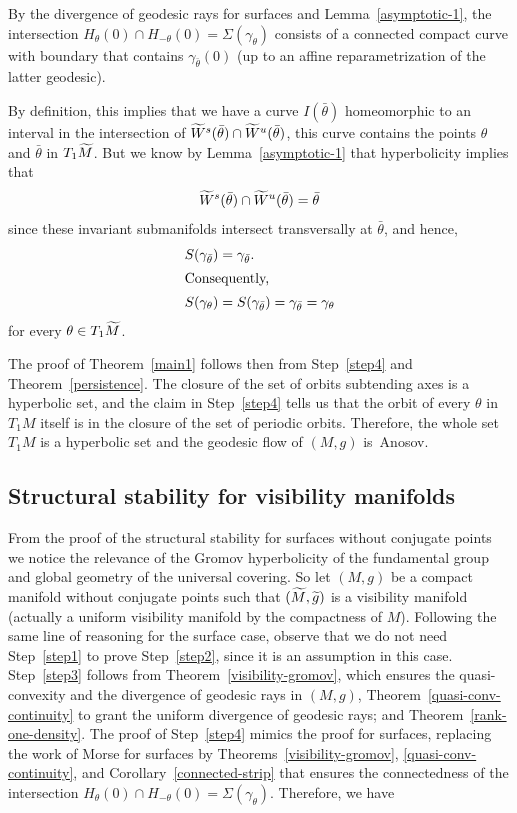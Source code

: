 \documentclass[AHL,Unicode,longabstracts,published]{cedram}
\let\oldtilde\tilde
\renewcommand*{\tilde}[1]{\mathchoice{\widetilde{#1}}{\widetilde{#1}}{\oldtilde{#1}}{\oldtilde{#1}}}
\begin{document}
By the divergence of geodesic rays for surfaces and Lemma~\ref{asymptotic-1}, the intersection $H_{\theta}(0) \cap H_{-\theta}(0) = \Sigma(\gamma_{\theta})$ consists of a connected compact curve with boundary that contains $\gamma_{\bar{\theta}}(0)$ (up to an affine reparametrization of the latter geodesic).

By definition, this implies that we have a curve $I(\bar{\theta})$ homeomorphic to an interval in the intersection of $\tilde{W}^{s}(\bar{\theta})\cap \tilde{W}^{u}(\bar{\theta})$, this curve contains the points $\theta$ and $\bar{\theta}$ in $T_{1}\tilde{M}$. But we know by Lemma~\ref{asymptotic-1} that hyperbolicity implies that
\[
\tilde{W}^{s}(\bar{\theta})\cap \tilde{W}^{u}(\bar{\theta}) = \bar{\theta}
\]
since these invariant submanifolds intersect transversally at $\bar{\theta}$, and hence,
\begin{align*}
S(\gamma_{\bar{\theta}}) &= \gamma_{\bar{\theta}}.
\\
\intertext{Consequently,}
S(\gamma_{\theta}) &= S(\gamma_{\bar{\theta}}) = \gamma_{\bar{\theta}} = \gamma_{\theta}
\end{align*}
for every $\theta \in T_{1}\tilde{M}$.

The proof of Theorem~\ref{main1} follows then from Step~\ref{step4} and Theorem~\ref{persistence}. The closure of the set of orbits subtending axes is a hyperbolic set, and the claim in Step~\ref{step4} tells us that the orbit of every $\theta $ in $T_{1}M$ itself is in the closure of the set of periodic orbits. Therefore, the whole set $T_{1}M$ is a hyperbolic set and the geodesic flow of $(M,g)$ is~Anosov.

\subsection{Structural stability for visibility manifolds}

From the proof of the structural stability for surfaces without conjugate points we notice the relevance of the Gromov hyperbolicity of the fundamental group and global geometry of the universal covering.
So let $(M,g)$ be a compact manifold without conjugate points such that $(\tilde{M}, \tilde{g})$ is a visibility manifold (actually a uniform visibility manifold by the compactness of $M$). Following the same line of reasoning for the surface case, observe that we do not need Step~\ref{step1} to prove Step~\ref{step2}, since it is an assumption in this case. Step~\ref{step3} follows from Theorem~\ref{visibility-gromov}, which ensures the quasi-convexity and the divergence of geodesic rays in $(M,g)$, Theorem~\ref{quasi-conv-continuity} to grant the uniform divergence of geodesic rays; and Theorem~\ref{rank-one-density}. The proof of Step~\ref{step4} mimics the proof for surfaces, replacing the work of Morse for surfaces by Theorems~\ref{visibility-gromov}, \ref{quasi-conv-continuity}, and Corollary~\ref{connected-strip} that ensures the connectedness of the intersection $H_{\theta}(0) \cap H_{-\theta}(0) =
\Sigma(\gamma_{\theta})$. Therefore, we have
\end{document}
